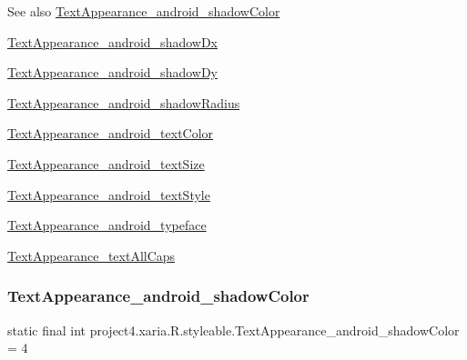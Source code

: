 \begin{DoxySeeAlso}{See also}
\hyperlink{classproject4_1_1xaria_1_1R_1_1styleable_a431d16372e40e52f770ef2d504ae3083}{Text\+Appearance\+\_\+android\+\_\+shadow\+Color} 

\hyperlink{classproject4_1_1xaria_1_1R_1_1styleable_a03f619c3ba347ef286757141c03559b5}{Text\+Appearance\+\_\+android\+\_\+shadow\+Dx} 

\hyperlink{classproject4_1_1xaria_1_1R_1_1styleable_ada1ad6d6bac889ac788f60bdf29ddc1c}{Text\+Appearance\+\_\+android\+\_\+shadow\+Dy} 

\hyperlink{classproject4_1_1xaria_1_1R_1_1styleable_ae958e2bce5916596d134543faa936c61}{Text\+Appearance\+\_\+android\+\_\+shadow\+Radius} 

\hyperlink{classproject4_1_1xaria_1_1R_1_1styleable_a2b25c50bd5f9e42c5a9fc5afb3dbcb37}{Text\+Appearance\+\_\+android\+\_\+text\+Color} 

\hyperlink{classproject4_1_1xaria_1_1R_1_1styleable_aee9f72e6edb60f105b97642812464a80}{Text\+Appearance\+\_\+android\+\_\+text\+Size} 

\hyperlink{classproject4_1_1xaria_1_1R_1_1styleable_aa7aadad2b1e03de56ffff6233004edd3}{Text\+Appearance\+\_\+android\+\_\+text\+Style} 

\hyperlink{classproject4_1_1xaria_1_1R_1_1styleable_a5f9cfadc1fc87f837610aa77360f6e3a}{Text\+Appearance\+\_\+android\+\_\+typeface} 

\hyperlink{classproject4_1_1xaria_1_1R_1_1styleable_ab717490758690b0582f6ffbc6ce728f4}{Text\+Appearance\+\_\+text\+All\+Caps} 
\end{DoxySeeAlso}
\mbox{\label{classproject4_1_1xaria_1_1R_1_1styleable_a431d16372e40e52f770ef2d504ae3083}} 
\subsubsection{\texorpdfstring{Text\+Appearance\+\_\+android\+\_\+shadow\+Color}{TextAppearance\_android\_shadowColor}}
{\footnotesize\ttfamily static final int project4.\+xaria.\+R.\+styleable.\+Text\+Appearance\+\_\+android\+\_\+shadow\+Color = 4\hspace{0.3cm}{\ttfamily [static]}}

